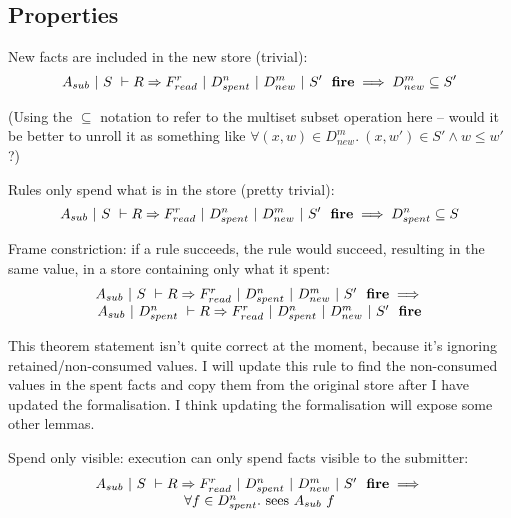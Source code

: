 

\subsection{Properties}


\begin{lemma}
New facts are included in the new store (trivial):
$$
A_{sub}~|~S~\vdash R \Rightarrow F_{read}^r~|~D_{spent}^n~|~D_{new}^m~|~S'~~\textbf{fire}
\implies
D_{new}^m \subseteq S'
$$
\end{lemma}
(Using the $\subseteq$ notation to refer to the multiset subset operation here -- would it be better to unroll it as something like $\forall (x,w) \in D_{new}^m.\ (x,w') \in S' \wedge w \le w'$ ?)

\begin{lemma}
Rules only spend what is in the store (pretty trivial):
$$
A_{sub}~|~S~\vdash R \Rightarrow F_{read}^r~|~D_{spent}^n~|~D_{new}^m~|~S'~~\textbf{fire}
\implies
D_{spent}^n \subseteq S
$$
\end{lemma}

\begin{theorem}
Frame constriction: if a rule succeeds, the rule would succeed, resulting in the same value, in a store containing only what it spent:
$$
\begin{array}{c}
A_{sub}~|~S~\vdash R \Rightarrow F_{read}^r~|~D_{spent}^n~|~D_{new}^m~|~S'~~\textbf{fire}
\implies \\
A_{sub}~|~D_{spent}^n~\vdash R \Rightarrow F_{read}^r~|~D_{spent}^n~|~D_{new}^m~|~S'~~\textbf{fire}
\end{array}
$$
\end{theorem}
This theorem statement isn't quite correct at the moment, because it's ignoring retained/non-consumed values. I will update this rule to find the non-consumed values in the spent facts and copy them from the original store after I have updated the formalisation. I think updating the formalisation will expose some other lemmas.

\begin{theorem}
Spend only visible: execution can only spend facts visible to the submitter:
$$
\begin{array}{c}
A_{sub}~|~S~\vdash R \Rightarrow F_{read}^r~|~D_{spent}^n~|~D_{new}^m~|~S'~~\textbf{fire}
\implies \\
\forall f \in D_{spent}^n.\ \textrm{sees}~ A_{sub}~ f
\end{array}
$$
\end{theorem}

